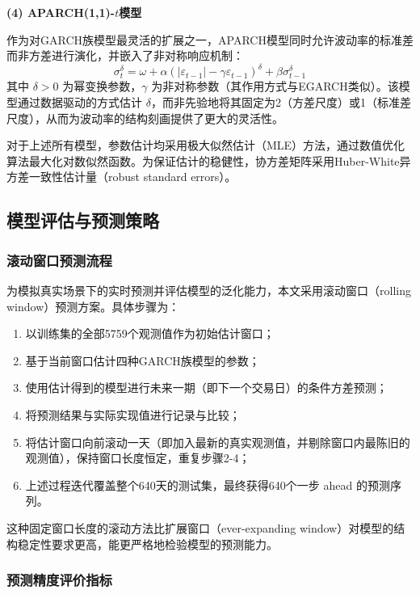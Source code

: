 \documentclass[12pt,a4paper]{ctexart}
\begin{document}
\textbf{(4) APARCH(1,1)-$t$模型}

作为对GARCH族模型最灵活的扩展之一，APARCH模型同时允许波动率的标准差而非方差进行演化，并嵌入了非对称响应机制\cite{ding1993}：
\begin{equation}\label{eq:aparch}
\sigma_t^\delta = \omega + \alpha (|\varepsilon_{t-1}| - \gamma \varepsilon_{t-1})^\delta + \beta \sigma_{t-1}^\delta
\end{equation}
其中 $\delta > 0$ 为幂变换参数，$\gamma$ 为非对称参数（其作用方式与EGARCH类似）。该模型通过数据驱动的方式估计 $\delta$，而非先验地将其固定为2（方差尺度）或1（标准差尺度），从而为波动率的结构刻画提供了更大的灵活性。

对于上述所有模型，参数估计均采用极大似然估计（MLE）方法，通过数值优化算法最大化对数似然函数。为保证估计的稳健性，协方差矩阵采用Huber-White异方差一致性估计量（robust standard errors）。

\subsection{模型评估与预测策略}

\subsubsection{滚动窗口预测流程}

为模拟真实场景下的实时预测并评估模型的泛化能力，本文采用滚动窗口（rolling window）预测方案。具体步骤为：
\begin{enumerate}
    \item 以训练集的全部5759个观测值作为初始估计窗口；
    \item 基于当前窗口估计四种GARCH族模型的参数；
    \item 使用估计得到的模型进行未来一期（即下一个交易日）的条件方差预测；
    \item 将预测结果与实际实现值进行记录与比较；
    \item 将估计窗口向前滚动一天（即加入最新的真实观测值，并剔除窗口内最陈旧的观测值），保持窗口长度恒定，重复步骤2-4；
    \item 上述过程迭代覆盖整个640天的测试集，最终获得640个一步 ahead 的预测序列。
\end{enumerate}

这种固定窗口长度的滚动方法比扩展窗口（ever-expanding window）对模型的结构稳定性要求更高，能更严格地检验模型的预测能力\cite{diebold1995}。

\subsubsection{预测精度评价指标}
\end{document}
